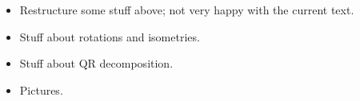 \begin{itemize}
  \item Restructure some stuff above; not very happy with the current text.
  \item Stuff about rotations and isometries.
  \item Stuff about QR decomposition.
  \item Pictures.
\end{itemize}



% 
% 


